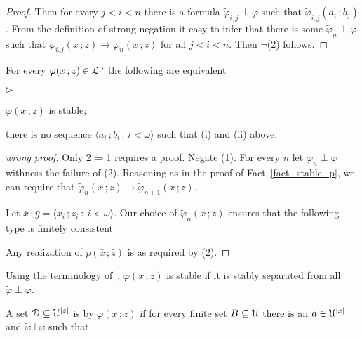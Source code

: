 \documentclass{amsproc}
\newcommand{\mylabel}[1]{{#1}\hfill}
\renewenvironment{itemize}
  {\begin{list}{$\triangleright$}{%
  \setlength{\parskip}{0mm}
  \setlength{\topsep}{.4\baselineskip}
  \setlength{\rightmargin}{0mm}
  \setlength{\listparindent}{0mm}
  \setlength{\itemindent}{0mm}
  \setlength{\labelwidth}{3ex}
  \setlength{\itemsep}{.2\baselineskip}
  \setlength{\parsep}{.2\baselineskip}
  \setlength{\partopsep}{0mm}
  \setlength{\labelsep}{1ex}
  \setlength{\leftmargin}{\labelwidth+\labelsep}
  \let\makelabel\mylabel}}{%
\end{list}}
\renewcommand*{\emph}[1]{%
   \smash{\tikz[baseline]\node[rectangle, fill=teal!25, rounded corners, inner xsep=0.5ex, inner ysep=0.2ex, anchor=base, minimum height = 2.7ex]{\strut #1};}}
\begin{document}
{\begin{proof}
  Then for every $j<i<n$ there is a formula  $\tilde\varphi_{i,j}\perp\varphi$ such that $\tilde\varphi_{i,j}(a_i\,;b_j)$.
  From the definition of strong negation it easy to infer that there is some $\tilde\varphi_n\perp\varphi$ such that $\tilde\varphi_{i,j}(x\,;z)\rightarrow\tilde\varphi_n(x\,;z)$ for all $j<i<n$.
  Then $\neg$(2) follows.
\end{proof}

\begin{fact}[wrong?]
  For every $\varphi(x\,;z)\in{\EuScript L}^{\rm p}$ the following are equivalent
  \begin{itemize}
    \item[1.] $\varphi(x\,;z)$ is stable;
    \item[2.] there is no sequence $\langle a_i\,;b_i\,:\,i<\omega\rangle$ such that (i) and (ii) above.
  \end{itemize} 
\end{fact}

\begin{proof}[wrong proof]
  Only 2$\Rightarrow$1 requires a proof.
  Negate (1).
  For every $n$ let $\tilde\varphi_n\perp\varphi$ withness the failure of (2).
  Reasoning as in the proof of Fact~\ref{fact_stable_p}, we can require that $\tilde\varphi_n(x\,;z)\rightarrow\tilde\varphi_{n+1}(x\,;z)$.
  
  Let $\bar x\,;\bar y=\langle x_i\,;z_i\ :\ i<\omega\rangle$.
  Our choice of $\tilde\varphi_n(x\,;z)$ ensures that the following type is finitely consistent


  Any realization of $p(\bar x\,;\bar z)$ is as required by (2).
\end{proof}

Using the terminology of~\cite{Hr}, $\varphi(x\,;z)$ is stable if it is stably separated from all $\tilde\varphi\perp\varphi$.


A set ${\EuScript D}\subseteq{\EuScript U}^{|z|}$ is \emph{finitely definable\/} by $\varphi(x\,;z)$ if for every finite set $B\subseteq{\EuScript U}$ there is an $a\in{\EuScript U}^{|x|}$ and $\tilde\varphi\bot\varphi$ such that



}
\end{document}
